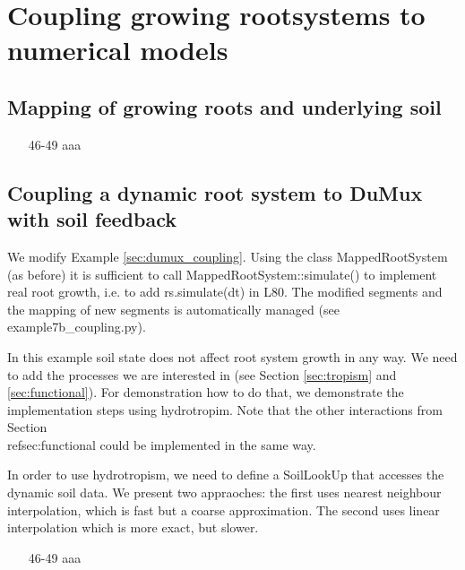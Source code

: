 \newpage
\section{Coupling growing rootsystems to numerical models} \label{sec:growing}

    
\subsection{Mapping of growing roots and underlying soil} 



\begin{itemize}
\item[46-49] aaa
\end{itemize}

\subsection{Coupling a dynamic root system to DuMux with soil feedback} \label{sec:dumux_dyn_coupling}

We modify Example \ref{sec:dumux_coupling}. Using the class MappedRootSystem (as before) it is sufficient to call MappedRootSystem::simulate() to implement real root growth, i.e. to add rs.simulate(dt) in L80. The modified segments and the mapping of new segments is automatically managed (see example7b\_coupling.py).


In this example soil state does not affect root system growth in any way. We need to add the processes we are interested in (see Section \ref{sec:tropism} and \ref{sec:functional}). For demonstration how to do that, we demonstrate the implementation steps using hydrotropim. Note that the other interactions from Section \\ref{sec:functional} could be implemented in the same way. 

In order to use hydrotropism, we need to define a SoilLookUp that accesses the dynamic soil data. We present two appraoches: the first uses nearest neighbour interpolation, which is fast but a coarse approximation. The second uses linear interpolation which is more exact, but slower. 




\begin{itemize}
\item[46-49] aaa
\end{itemize}

